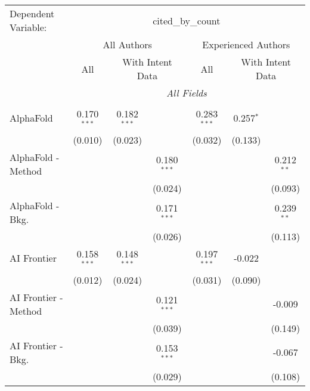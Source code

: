 \begingroup
\centering
\begin{tabular}{lcccccc}
   \tabularnewline \midrule \midrule
   Dependent Variable: & \multicolumn{6}{c}{cited\_by\_count}\\
 & \multicolumn{3}{c}{All Authors} & \multicolumn{3}{c}{Experienced Authors} \\
\cmidrule(lr){2-4} \cmidrule(lr){5-7}
 & \multicolumn{1}{c}{All} & \multicolumn{2}{c}{With Intent Data} & \multicolumn{1}{c}{All} & \multicolumn{2}{c}{With Intent Data} \\
\cmidrule(lr){2-2} \cmidrule(lr){3-4} \cmidrule(lr){5-5} \cmidrule(lr){6-7}
 & \multicolumn{6}{c}{\textit{All Fields}} \\ \\
   AlphaFold            & 0.170$^{***}$ & 0.182$^{***}$ &               & 0.283$^{***}$ & 0.257$^{*}$   &   \\   
                        & (0.010)       & (0.023)       &               & (0.032)       & (0.133)       &   \\   
   AlphaFold - Method   &               &               & 0.180$^{***}$ &               &               & 0.212$^{**}$\\   
                        &               &               & (0.024)       &               &               & (0.093)\\   
   AlphaFold - Bkg.     &               &               & 0.171$^{***}$ &               &               & 0.239$^{**}$\\   
                        &               &               & (0.026)       &               &               & (0.113)\\   
   AI Frontier          & 0.158$^{***}$ & 0.148$^{***}$ &               & 0.197$^{***}$ & -0.022        &   \\   
                        & (0.012)       & (0.024)       &               & (0.031)       & (0.090)       &   \\   
   AI Frontier - Method &               &               & 0.121$^{***}$ &               &               & -0.009\\   
                        &               &               & (0.039)       &               &               & (0.149)\\   
   AI Frontier - Bkg.   &               &               & 0.153$^{***}$ &               &               & -0.067\\   
                        &               &               & (0.029)       &               &               & (0.108)\\   

\end{tabular}
